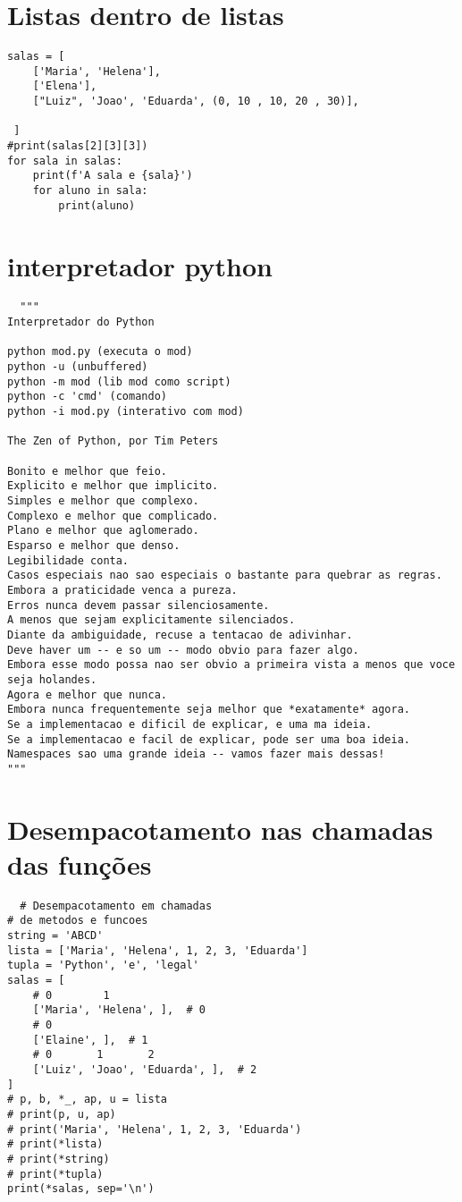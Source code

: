 \documentclass{article}
\begin{document}
\section{Listas dentro de listas}
\begin {lstlisting}
salas = [
    ['Maria', 'Helena'],
    ['Elena'],
    ["Luiz", 'Joao', 'Eduarda', (0, 10 , 10, 20 , 30)],
  
 ]
#print(salas[2][3][3])
for sala in salas:
    print(f'A sala e {sala}')
    for aluno in sala:
        print(aluno)
\end{lstlisting}
\section{interpretador python}
\begin{lstlisting}
  """
Interpretador do Python

python mod.py (executa o mod)
python -u (unbuffered)
python -m mod (lib mod como script)
python -c 'cmd' (comando)
python -i mod.py (interativo com mod)

The Zen of Python, por Tim Peters

Bonito e melhor que feio.
Explicito e melhor que implicito.
Simples e melhor que complexo.
Complexo e melhor que complicado.
Plano e melhor que aglomerado.
Esparso e melhor que denso.
Legibilidade conta.
Casos especiais nao sao especiais o bastante para quebrar as regras.
Embora a praticidade venca a pureza.
Erros nunca devem passar silenciosamente.
A menos que sejam explicitamente silenciados.
Diante da ambiguidade, recuse a tentacao de adivinhar.
Deve haver um -- e so um -- modo obvio para fazer algo.
Embora esse modo possa nao ser obvio a primeira vista a menos que voce seja holandes.
Agora e melhor que nunca.
Embora nunca frequentemente seja melhor que *exatamente* agora.
Se a implementacao e dificil de explicar, e uma ma ideia.
Se a implementacao e facil de explicar, pode ser uma boa ideia.
Namespaces sao uma grande ideia -- vamos fazer mais dessas!
""" 
\end{lstlisting}
\section{Desempacotamento nas chamadas das funções}
\begin{lstlisting}
  # Desempacotamento em chamadas
# de metodos e funcoes
string = 'ABCD'
lista = ['Maria', 'Helena', 1, 2, 3, 'Eduarda']
tupla = 'Python', 'e', 'legal'
salas = [
    # 0        1
    ['Maria', 'Helena', ],  # 0
    # 0
    ['Elaine', ],  # 1
    # 0       1       2
    ['Luiz', 'Joao', 'Eduarda', ],  # 2
]
# p, b, *_, ap, u = lista
# print(p, u, ap)
# print('Maria', 'Helena', 1, 2, 3, 'Eduarda')
# print(*lista)
# print(*string)
# print(*tupla)
print(*salas, sep='\n')
\end{lstlisting}
\end{document}
